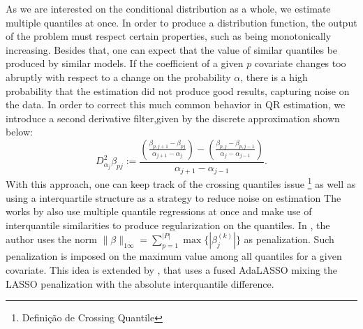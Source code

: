 As we are interested on the conditional distribution as a whole, we estimate multiple quantiles at once. In order to produce a distribution function, the output of the problem must respect certain properties, such as being monotonically increasing. 
Besides that, one can expect that the value of similar quantiles be produced by similar models. If the coefficient of a given $p$ covariate changes too abruptly with respect to a change on the probability $\alpha$, there is a high probability that the estimation did not produce good results, capturing noise on the data.  In order to correct this much common behavior in QR estimation, we introduce a second derivative filter,given by the discrete approximation shown below:
\begin{equation}
D_{\alpha_j}^{2} \beta_{pj} := \frac{\left(\frac{\beta_{p,j+1}-\beta_{pj}}{\alpha_{j+1}-\alpha_{j}}\right)-\left(\frac{\beta_{p,j}-\beta_{p,j-1}}{\alpha_{j}-\alpha_{j-1}}\right)}{\alpha_{j+1}-\alpha_{j-1}}. 
\end{equation}
With this approach, one can keep track of the crossing quantiles issue \footnote{Definição de Crossing Quantile} %
as well as using a interquartile structure as a strategy to reduce noise on estimation %
The works by \cite{zou_regularized_2008, jiang_interquantile_2014} also use multiple quantile regressions at once and make use of interquantile similarities to produce regularization on the quantiles. In \cite{zou_regularized_2008}, the author uses the norm $\| \beta \|_{1\infty}=\sum_{p=1}^{|P|} \max\{ |\beta_j^{(k)} |\}$ as penalization. Such penalization is imposed on the maximum value among all quantiles for a given covariate. This idea is extended by \cite{jiang_interquantile_2014}, that uses a fused AdaLASSO mixing the LASSO penalization with the absolute interquantile difference.

